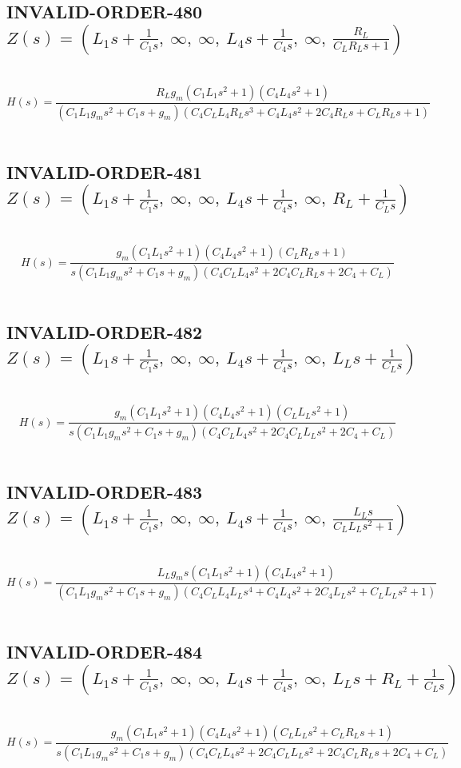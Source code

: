 \documentclass{article}
\begin{document}
\subsection{INVALID-ORDER-480 $Z(s) = \left( L_{1} s + \frac{1}{C_{1} s}, \  \infty, \  \infty, \  L_{4} s + \frac{1}{C_{4} s}, \  \infty, \  \frac{R_{L}}{C_{L} R_{L} s + 1}\right)$ } \ 
\textbf{\[H(s) = \frac{R_{L} g_{m} \left(C_{1} L_{1} s^{2} + 1\right) \left(C_{4} L_{4} s^{2} + 1\right)}{\left(C_{1} L_{1} g_{m} s^{2} + C_{1} s + g_{m}\right) \left(C_{4} C_{L} L_{4} R_{L} s^{3} + C_{4} L_{4} s^{2} + 2 C_{4} R_{L} s + C_{L} R_{L} s + 1\right)}\] } \ 
\subsection{INVALID-ORDER-481 $Z(s) = \left( L_{1} s + \frac{1}{C_{1} s}, \  \infty, \  \infty, \  L_{4} s + \frac{1}{C_{4} s}, \  \infty, \  R_{L} + \frac{1}{C_{L} s}\right)$ } \ 
\textbf{\[H(s) = \frac{g_{m} \left(C_{1} L_{1} s^{2} + 1\right) \left(C_{4} L_{4} s^{2} + 1\right) \left(C_{L} R_{L} s + 1\right)}{s \left(C_{1} L_{1} g_{m} s^{2} + C_{1} s + g_{m}\right) \left(C_{4} C_{L} L_{4} s^{2} + 2 C_{4} C_{L} R_{L} s + 2 C_{4} + C_{L}\right)}\] } \ 
\subsection{INVALID-ORDER-482 $Z(s) = \left( L_{1} s + \frac{1}{C_{1} s}, \  \infty, \  \infty, \  L_{4} s + \frac{1}{C_{4} s}, \  \infty, \  L_{L} s + \frac{1}{C_{L} s}\right)$ } \ 
\textbf{\[H(s) = \frac{g_{m} \left(C_{1} L_{1} s^{2} + 1\right) \left(C_{4} L_{4} s^{2} + 1\right) \left(C_{L} L_{L} s^{2} + 1\right)}{s \left(C_{1} L_{1} g_{m} s^{2} + C_{1} s + g_{m}\right) \left(C_{4} C_{L} L_{4} s^{2} + 2 C_{4} C_{L} L_{L} s^{2} + 2 C_{4} + C_{L}\right)}\] } \ 
\subsection{INVALID-ORDER-483 $Z(s) = \left( L_{1} s + \frac{1}{C_{1} s}, \  \infty, \  \infty, \  L_{4} s + \frac{1}{C_{4} s}, \  \infty, \  \frac{L_{L} s}{C_{L} L_{L} s^{2} + 1}\right)$ } \ 
\textbf{\[H(s) = \frac{L_{L} g_{m} s \left(C_{1} L_{1} s^{2} + 1\right) \left(C_{4} L_{4} s^{2} + 1\right)}{\left(C_{1} L_{1} g_{m} s^{2} + C_{1} s + g_{m}\right) \left(C_{4} C_{L} L_{4} L_{L} s^{4} + C_{4} L_{4} s^{2} + 2 C_{4} L_{L} s^{2} + C_{L} L_{L} s^{2} + 1\right)}\] } \ 
\subsection{INVALID-ORDER-484 $Z(s) = \left( L_{1} s + \frac{1}{C_{1} s}, \  \infty, \  \infty, \  L_{4} s + \frac{1}{C_{4} s}, \  \infty, \  L_{L} s + R_{L} + \frac{1}{C_{L} s}\right)$ } \ 
\textbf{\[H(s) = \frac{g_{m} \left(C_{1} L_{1} s^{2} + 1\right) \left(C_{4} L_{4} s^{2} + 1\right) \left(C_{L} L_{L} s^{2} + C_{L} R_{L} s + 1\right)}{s \left(C_{1} L_{1} g_{m} s^{2} + C_{1} s + g_{m}\right) \left(C_{4} C_{L} L_{4} s^{2} + 2 C_{4} C_{L} L_{L} s^{2} + 2 C_{4} C_{L} R_{L} s + 2 C_{4} + C_{L}\right)}\] } \ 
\end{document}
